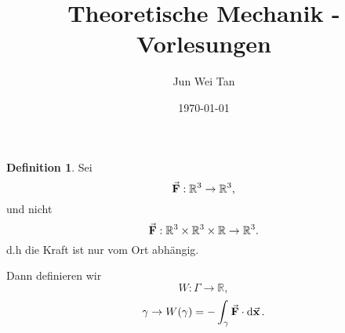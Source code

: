\documentclass[prb,12pt]{revtex4-2}
\theoremstyle{definition}
\theoremstyle{definition}
\newtheorem{Definition}[Theorem]{Definition}
\newcommand{\R}{\mathbb{R}}
\begin{document}
\title{Theoretische Mechanik - Vorlesungen}
\author{Jun Wei Tan}
\date{\today}
\maketitle

\begin{Definition}
	Sei
	\[
	\va F : \R^3 \to \R^3
	,\] 
	und nicht
	\[
	\va F : \R^3 \times \R^3 \times \R \to \R^3
	.\]
	d.h die Kraft ist nur vom Ort abhängig.

	Dann definieren wir
	\[
	W: \Gamma \to \R,\]
	\[
		\gamma \to W(\gamma)=-\int_\gamma \va F\cdot \dd{\va x}
	.\] 
\end{Definition}
\end{document}
